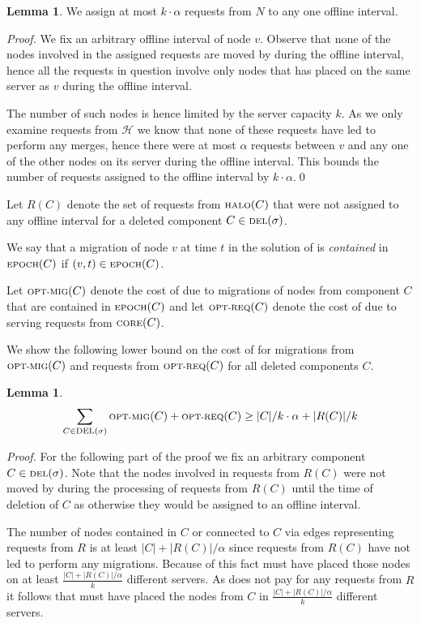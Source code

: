 \documentclass[a4paper, 10pt]{article}
\newcommand{\nl}{\newline}
\newcommand{\crep}{\text{C{\scriptsize REP}}}
\newcommand{\optmig}{\text{\scriptsize OPT-MIG}}
\newcommand{\optreq}{\text{\scriptsize OPT-REQ}}
\newcommand{\del}{\text{\scriptsize DEL}}
\newcommand{\opt}{\text{O{\scriptsize PT}}}
\newcommand{\core}{\text{\scriptsize CORE}}
\newcommand{\halo}{\text{\scriptsize HALO}}
\newcommand{\epoch}{\text{\scriptsize EPOCH}}
\theoremstyle{definition}
\newtheorem{lemma}[defi]{Lemma}
\begin{document}
\begin{lemma}
	\label{offl_int_lemma}
	We assign at most $k\cdot\alpha$ requests from $N$ to any one offline interval.
\end{lemma}

\textit{Proof.} We fix an arbitrary offline interval of node $v$. Observe that none of the nodes involved in the assigned requests are moved by \opt{} during the offline interval, hence all the requests in question involve only nodes that \opt{} has placed on the same server as $v$ during the offline interval. 

The number of such nodes is hence limited by the server capacity $k$. As we only examine requests from $\mathcal{H}$ we know that none of these requests have led \crep{} to perform any merges, hence there were at most $\alpha$ requests between $v$ and any one of the other nodes on its server during the offline interval. This bounds the number of requests assigned to the offline interval by $k\cdot\alpha$.\qed\nl

Let $R(C)$ denote the set of requests from $\halo(C)$ that were not assigned to any offline interval for a deleted component $C\in\del(\sigma)$.

We say that a migration of node $v$ at time $t$ in the solution of \opt{} is \textit{contained} in $\epoch(C)$ if $(v,t)\in\epoch(C)$.

Let $\optmig(C)$ denote the cost of \opt{} due to migrations of nodes from component $C$ that are contained in $\epoch(C)$ and let $\optreq(C)$ denote the cost of \opt{} due to serving requests from $\core(C)$.

We show the following lower bound on the cost of \opt{} for migrations from $\optmig(C)$ and requests from $\optreq(C)$ for all deleted components $C$.

\begin{lemma}
	\label{opt_c_mig_req_lemma}
	\begin{align*}
		\sum_{C\in\del(\sigma)}\optmig(C)+\optreq(C)\geq |C|/k\cdot\alpha+|R(C)|/k
	\end{align*}
\end{lemma}

\textit{Proof.} For the following part of the proof we fix an arbitrary component $C\in\del{}(\sigma)$. Note that the nodes involved in requests from $R(C)$ were not moved by \opt{} during the processing of requests from $R(C)$ until the time of deletion of $C$ as otherwise they would be assigned to an offline interval.

The number of nodes contained in $C$ or connected to $C$ via edges representing requests from $R$ is at least $|C|+|R(C)|/\alpha$ since requests from $R(C)$ have not led \crep{} to perform any migrations. Because of this fact \opt{} must have placed those nodes on at least $\frac{|C|+|R(C)|/\alpha}{k}$ different servers. As \opt{} does not pay for any requests from $R$ it follows that \opt{} must have placed the nodes from $C$ in $\frac{|C|+|R(C)|/\alpha}{k}$ different servers.
\end{document}
